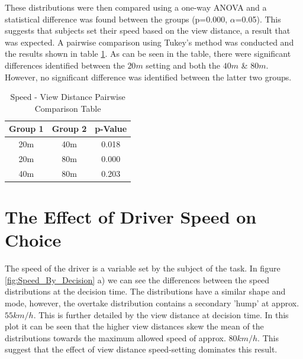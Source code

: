 These distributions were then compared using a one-way ANOVA and a statistical difference was found between the groups (p=0.000, $\alpha$=0.05). This suggests that subjects set their speed based on the view distance, a result that was expected. A pairwise comparison using Tukey's method was conducted and the results shown in table \ref{tab:RSLT_Pairwise}. As can be seen in the table, there were significant differences identified between the $20m$ setting and both the $40m$ \& $80m$. However, no significant difference was identified between the latter two groups.

\begin{table}[H]
    \begin{center}
        \caption{Speed - View Distance Pairwise Comparison Table}
        \label{tab:RSLT_Pairwise}
        \begin{tabular}{c|c|c}
        \hline
        Group 1 &   Group 2 &   p-Value     \\ \hline
        20m       &   40m   &   0.018       \\
        20m       &   80m   &   0.000       \\
        40m       &   80m   &   0.203       \\ \hline
        \end{tabular}
    \end{center}
\end{table}

\section{The Effect of Driver Speed on Choice}
The speed of the driver is a variable set by the subject of the task. In figure \ref{fig:Speed_By_Decision} a) we can see the differences between the speed distributions at the decision time. The distributions have a similar shape and mode, however, the overtake distribution contains a secondary 'hump' at approx. $55 km/h$. This is further detailed by the view distance at decision time. In this plot it can be seen that the higher view distances skew the mean of the distributions towards the maximum allowed speed of approx. $80 km/h$. This suggest that the effect of view distance speed-setting dominates this result.

